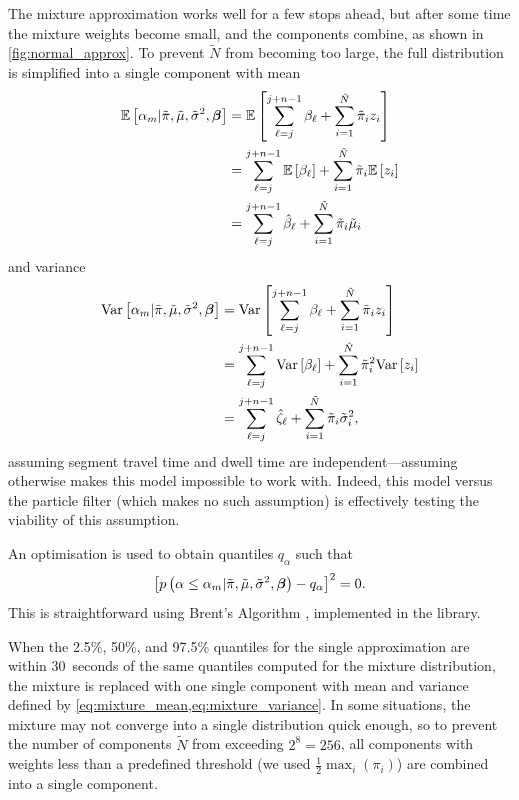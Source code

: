 The mixture approximation works well for a few stops ahead, but after some time the mixture weights become small, and the components combine, as shown in \cref{fig:normal_approx}. To prevent $\tilde N$ from becoming too large, the full distribution is simplified into a single component with mean
\begin{equation}
\label{eq:mixture_mean}
\begin{split}
\mathbb{E}\left[\alpha_m | \tilde\pi, \tilde\mu, \tilde\sigma^2, \boldsymbol\beta\right] &=
\mathbb{E}\left[\sum_{\ell=j}^{j+n-1} \beta_\ell +
  \sum_{i=1}^{\tilde N} \tilde\pi_i z_i\right] \\
&= \sum_{\ell=j}^{j+n-1} \mathbb{E}\left[\beta_\ell\right] +
  \sum_{i=1}^{\tilde N} \tilde\pi_i \mathbb{E}\left[z_i\right] \\
&= \sum_{\ell=j}^{j+n-1} \hat{\beta}_\ell +
  \sum_{i=1}^{\tilde N} \tilde\pi_i \tilde\mu_i
\end{split}
\end{equation}
and variance
\begin{equation}
\label{eq:mixture_variance}
\begin{split}
\mathrm{Var}\left[\alpha_m | \tilde\pi, \tilde\mu, \tilde\sigma^2, \boldsymbol\beta\right] &=
\mathrm{Var}\left[\sum_{\ell=j}^{j+n-1} \beta_\ell +
  \sum_{i=1}^{\tilde N} \tilde\pi_i z_i\right] \\
&= \sum_{\ell=j}^{j+n-1} \mathrm{Var}\left[\beta_\ell\right] +
  \sum_{i=1}^{\tilde N} \tilde\pi_i^2 \mathrm{Var}\left[z_i\right] \\
&= \sum_{\ell=j}^{j+n-1} \hat{\zeta}_\ell +
  \sum_{i=1}^{\tilde N} \tilde\pi_i \tilde\sigma_i^2,
\end{split}
\end{equation}
assuming segment travel time and dwell time are independent---assuming otherwise makes this model impossible to work with. Indeed, this model versus the particle filter (which makes no such assumption) is effectively testing the viability of this assumption.


An optimisation is used to obtain quantiles $q_\alpha$ such that
\begin{equation}
\label{eq:mixture_quadratic}
\left[
  p\left(\alpha \leq \alpha_m | \tilde\pi, \tilde\mu, \tilde\sigma^2, \boldsymbol\beta\right) - q_\alpha
\right]^2 = 0.
\end{equation}
This is straightforward using Brent's Algorithm \citep{Brent_1971}, implemented in the  \Cpp{} library.

When the 2.5\%, 50\%, and 97.5\% quantiles for the single approximation are within 30~seconds of the same quantiles computed for the mixture distribution, the mixture is replaced with one single component with mean and variance defined by \cref{eq:mixture_mean,eq:mixture_variance}. In some situations, the mixture may not converge into a single distribution quick enough, so to prevent the number of components $\tilde N$ from exceeding $2^8=256$, all components with weights less than a predefined threshold (we used $\frac{1}{2}\max_i(\pi_i)$) are combined into a single component.
